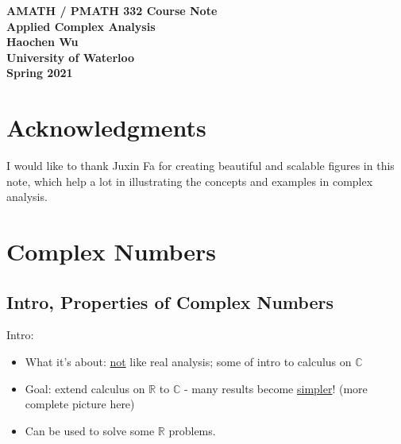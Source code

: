 \documentclass[12pt,titlepage]{article}
\let\stdsection\section
\renewcommand\section{\clearpage\stdsection}
\begin{document}
\begin{titlepage}
	\vspace*{\fill}
	\centering
		
	\textbf{\Huge AMATH / PMATH 332 Course Note} \\ [0.4em]
	\textbf{\Large Applied Complex Analysis} \\ [1em]
	\textbf{\Large Haochen Wu} \\ [1em]
	\textbf{\large University of Waterloo} \\
	\textbf{\large Spring 2021} \\
	\vspace*{\fill}
\end{titlepage}

\newpage 

\section*{Acknowledgments}
I would like to thank Juxin Fa for creating beautiful and scalable figures in this note, which help a lot in illustrating the concepts and examples in complex analysis. 
\newpage

\tableofcontents
\newpage


\section{Complex Numbers}
\subsection{Intro, Properties of Complex Numbers}
Intro: \begin{itemize}
	\item What it's about: \underline{not} like real analysis; some of intro to calculus on $\mathbb{C}$
	\item Goal: extend calculus on $\mathbb{R}$ to $\mathbb{C}$ - many results become \underline{simpler}! (more complete picture here)
	\item Can be used to solve some $\mathbb{R}$ problems. 
\end{itemize}
\end{document}
